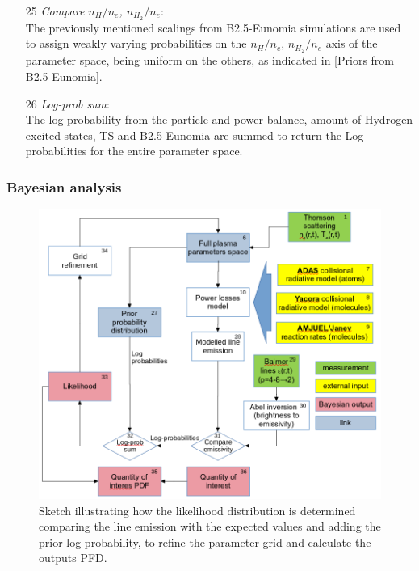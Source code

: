 \begin{enumerate}
    \item[25] \emph{Compare $n_H/n_e$, $n_{H_2}/n_e$}: \\The previously mentioned scalings from B2.5-Eunomia simulations are used to assign weakly varying probabilities on the $n_H/n_e$, $n_{H_2}/n_e$ axis of the parameter space, being uniform on the others, as indicated in \autoref{Priors from B2.5 Eunomia}.
    \item[26] \emph{Log-prob sum}: \\The log probability from the particle and power balance, amount of Hydrogen excited states, TS and B2.5 Eunomia are summed to return the Log-probabilities for the entire parameter space.
\end{enumerate}

\subsubsection{Bayesian analysis}\label{Bayesian analysis}

\begin{figure}[!ht]
	\centering
	\includegraphics[scale=0.29,trim={0 0 0 0},clip]{Chapters/chapter3/figs/bayesian_steps13.png}
	\caption{Sketch illustrating how the likelihood distribution is determined comparing the line emission with the expected values and adding the prior log-probability, to refine the parameter grid and calculate the outputs PFD.}
	\label{fig:bayes1c}
\end{figure}


